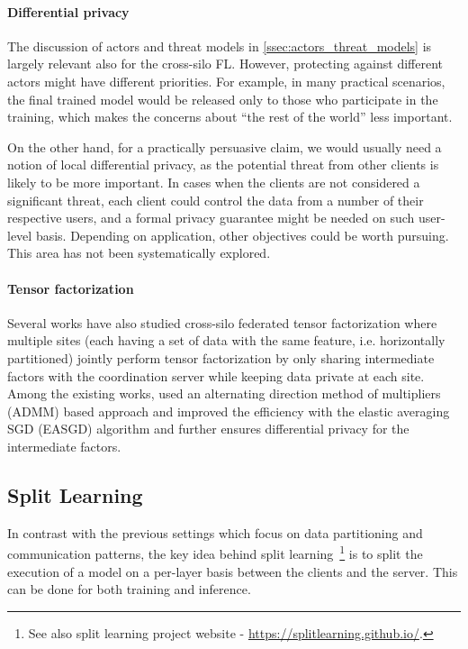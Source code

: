 \documentclass[11pt]{article}
\begin{document}
\paragraph{Differential privacy} The discussion of actors and threat models in \cref{ssec:actors_threat_models} is largely relevant also for the cross-silo FL. However, protecting against different actors might have different priorities. For example, in many practical scenarios, the final trained model would be released only to those who participate in the training, which makes the concerns about ``the rest of the world'' less important. 

On the other hand, for a practically persuasive claim, we would usually need a notion of local differential privacy, as the potential threat from other clients is likely to be more important. In cases when the clients are not considered a significant threat, each client could control the data from a number of their respective users, and a formal privacy guarantee might be needed on such user-level basis. Depending on application, other objectives could be worth pursuing. This area has not been systematically explored.

\paragraph{Tensor factorization} Several works have also studied cross-silo federated tensor factorization where multiple sites (each having a set of data with the same feature, i.e. horizontally partitioned) jointly perform tensor factorization by only sharing intermediate factors with the coordination server while keeping data private at each site. Among the existing works, \cite{DBLP:conf/kdd/KimSYJ17} used an alternating direction method of multipliers (ADMM) based approach and \cite{ma19cikm} improved the efficiency with the elastic averaging SGD (EASGD) algorithm and further ensures differential privacy for the intermediate factors.



\subsection{Split Learning}
\label{ssec:split-learning}

In contrast with the previous settings which focus on data partitioning and communication patterns, the key idea behind split learning~\citep{gupta2018distributed,vepakomma2018split}\footnote{See also split learning project website - \url{https://splitlearning.github.io/}.} is to split the execution of a model on a per-layer basis between the clients and the server. This can be done for both training and inference. 
\end{document}
